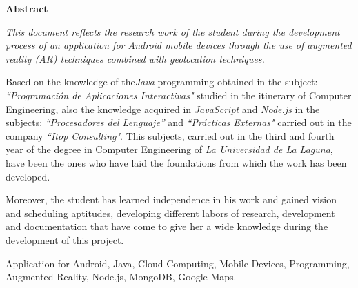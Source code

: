 \documentclass[spanish,a4paper,12pt,oneside]{extreport}
\newenvironment{summary}
{\par\noindent\begin{center}\textbf{Abstract}\end{center}\begin{itshape}\par\noindent}
{\end{itshape}}
\newenvironment{keywords}
{\begin{list}{}{\setlength{\leftmargin}{1em}}\item[\hskip\labelsep \bfseries Keywords:]}
{\end{list}}
\begin{document}
\newpage  %
\begin{summary}

{\em
This document reflects the research work of the student during the development process of an application for Android mobile devices through the use of augmented reality (AR) techniques combined with geolocation techniques.

\bigskip

Based on the knowledge of the\textit{Java} programming obtained in the
subject: \textit{“Programación de Aplicaciones Interactivas"} studied in the itinerary of Computer Engineering, also the knowledge acquired in \textit{JavaScript} and \textit{Node.js}  in the subjects: \textit{“Procesadores del Lenguaje”} and \textit{“Prácticas Externas"} carried out in the company \textit{“Itop Consulting"}. This subjects, carried out in the third and fourth year of the degree in Computer Engineering of \textit{La Universidad de La Laguna}, have been the ones who have laid the foundations from which the work has been developed.

\bigskip
Moreover, the student has learned independence in his work and gained vision and scheduling aptitudes, developing different labors of research, development and documentation that have come to give her a wide knowledge during the development of this project.

}

\begin{keywords}
Application for Android, Java, Cloud Computing, Mobile Devices, Programming, Augmented Reality, Node.js, MongoDB, Google Maps.
\end{keywords}

\end{summary}

\newpage{\pagestyle{empty}}
\thispagestyle{empty}



\pagestyle{myheadings} %

\renewcommand{\thepage}{\roman{page}}
\setcounter{page}{1}
\end{document}
